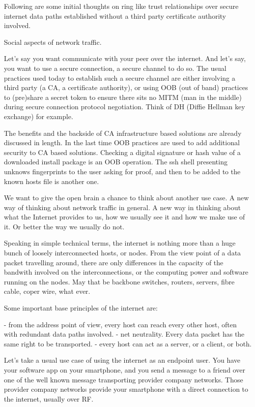 Following are some initial thoughts on ring like trust relationships
over secure internet data paths established without a third party
certificate authority involved.

Social aspects of network traffic.

Let's say you want communicate with your peer over the internet. And
let's say, you want to use a secure connection, a secure channel to do
so.  The usual practices used today to establish such a secure channel
are either involving a third party (a CA, a certificate authority), or
using OOB (out of band) practices to (pre)share a secret token to
ensure there sits no MITM (man in the middle) during secure connection
protocol negotiation. Think of DH (Diffie Hellman key exchange) for
example.

The benefits and the backside of CA infrastructure based solutions are
already discussed in length. In the last time OOB practices are used
to add additional security to CA based solutions. Checking a digital
signature or hash value of a downloaded install package is an OOB
operation. The ssh shell presenting unknows fingerprints to the user
asking for proof, and then to be added to the known hosts file is
another one.

We want to give the open brain a chance to think about another use
case. A new way of thinking about network traffic in general. A new
way in thinking about what the Internet provides to us, how we usually
see it and how we make use of it. Or better the way we usually do not.


Speaking in simple technical terms, the internet is nothing more than
a huge bunch of loosely interconnected hosts, or nodes. From the view
point of a data packet travelling around, there are only differences
in the capacity of the bandwith involved on the interconnections, or
the computing power and software running on the nodes. May that be
backbone switches, routers, servers, fibre cable, coper wire, what
ever.

Some important base principles of the internet are:

- from the address point of view, every host can reach every other
host, often with redundant data paths involved.
- net neutrality. Every data packet has the same right to be transported.
- every host can act as a server, or a client, or both.

Let's take a usual use case of using the internet as an endpoint
user. You have your software app on your smartphone, and you send a
message to a friend over one of the well known message transporting
provider company networks. Those provider company networks provide
your smartphone with a direct connection to the internet, usually over
RF.

